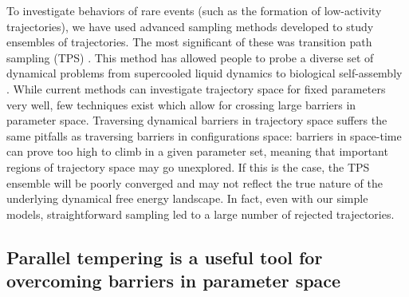 \documentclass[11pt]{article}
\begin{document}

To investigate behaviors of rare events (such as the formation of low-activity trajectories), we have used advanced sampling methods developed to study ensembles of trajectories. The most significant of these was transition path sampling (TPS) \cite{Bolhuis_AnnuRevPhysChem_2002}.  This method has allowed people to probe a diverse set of dynamical problems from supercooled liquid dynamics \cite{Merolle_PNAS_Aug_2005} to biological self-assembly \cite{TenWolde2002}. While current methods can investigate trajectory space for fixed parameters very well, few techniques exist which allow for crossing large barriers  in parameter space. Traversing dynamical barriers in trajectory space suffers the same pitfalls as traversing barriers in configurations space: barriers in space-time can prove too high to climb in a given parameter set, meaning that important regions of trajectory space may go unexplored.  If this is the case, the TPS ensemble will be poorly converged and may not reflect the true nature of the underlying dynamical free energy landscape. In fact, even with our simple models, straightforward sampling led to a large number of rejected trajectories.

\subsection*{Parallel tempering is a useful tool for overcoming barriers in parameter space}
\end{document}
